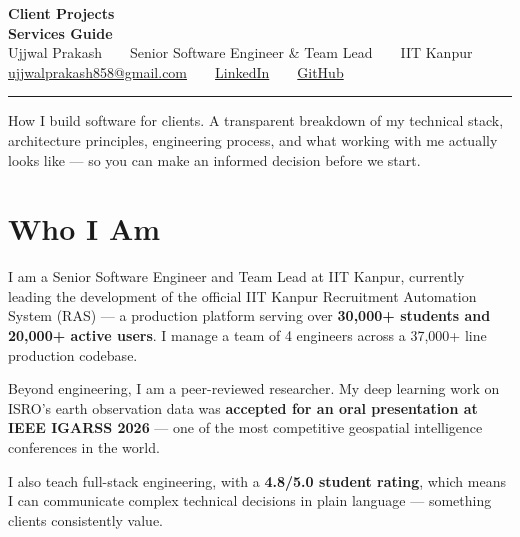 \documentclass[11pt,a4paper]{article}
\begin{document}
\begin{center}
  {\fontsize{28}{32}\selectfont\bfseries\color{dark} Client Projects}\\[4pt]
  {\fontsize{28}{32}\selectfont\bfseries\color{brand} Services Guide}\\[12pt]
  {\small\color{mid} Ujjwal Prakash\ \ \textbullet\ \ Senior Software Engineer \& Team Lead\ \ \textbullet\ \ IIT Kanpur}\\[4pt]
  {\small\color{mid}
    \href{mailto:ujjwalprakash858@gmail.com}{ujjwalprakash858@gmail.com}\ \ \textbullet\ \ 
    \href{https://www.linkedin.com/in/ujjwal-prakash-036873336/}{LinkedIn}\ \ \textbullet\ \ 
    \href{https://github.com/ujjwalPrakash-spike}{GitHub}
  }
\end{center}

\vspace{0.5em}
\color{rule}\rule{\linewidth}{0.4pt}\color{dark}
\vspace{0.8em}

{\color{mid}\small
How I build software for clients. A transparent breakdown of my technical stack, architecture principles, engineering process, and what working with me actually looks like — so you can make an informed decision before we start.
}

\vspace{1em}

\section{Who I Am}

I am a Senior Software Engineer and Team Lead at IIT Kanpur, currently leading the development of the official IIT Kanpur Recruitment Automation System (RAS) — a production platform serving over \textbf{30,000+ students and 20,000+ active users}. I manage a team of 4 engineers across a 37,000+ line production codebase.

Beyond engineering, I am a peer-reviewed researcher. My deep learning work on ISRO's earth observation data was \textbf{accepted for an oral presentation at IEEE IGARSS 2026} — one of the most competitive geospatial intelligence conferences in the world.

I also teach full-stack engineering, with a \textbf{4.8/5.0 student rating}, which means I can communicate complex technical decisions in plain language — something clients consistently value.
\end{document}
